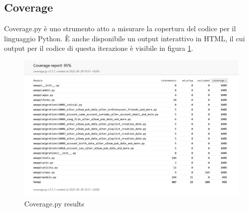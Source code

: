 \newpage
\subsection{Coverage}
Coverage.py è uno strumento atto a misurare la copertura del codice per il linguaggio
Python. È anche disponibile un output interattivo in HTML, il cui output per il codice di questa iterazione è visibile
in figura \ref{fig-coverage}.
\begin{figure} [H]
    \centering
    \includegraphics[scale=0.22]{images/coverage.png}
    \caption{Coverage.py results}
    \label{fig-coverage}
\end{figure}
